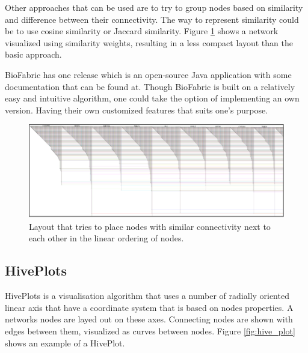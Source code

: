 \documentclass[a4paper,11pt]{kth-mag}
\begin{document}
Other approaches that can be used are to try to group nodes based on similarity and difference between their connectivity. The way to
represent similarity could be to use cosine similarity\cite{website:Wikipedia} or Jaccard similarity\cite{website:Wikipedia2}. Figure \ref{fig:bio_sim} shows a network visualized 
using similarity weights, resulting in a less compact layout than the basic approach.

BioFabric has one release which is an open-source Java application with some documentation that can be found at\cite{website:biofabricdoc}. Though BioFabric is built on a relatively easy and intuitive algorithm, one could
take the option of implementing an own version. Having their own customized features that suits one's purpose.
\\


\begin{figure}[!htbp]
	\centering
	\includegraphics[scale=0.5]{BIOSim}
	\caption{Layout that tries to place nodes with similar connectivity next to each other in the linear ordering of nodes.}
	\label{fig:bio_sim}
\end{figure}

\subsection{HivePlots}
HivePlots is a visualisation algorithm that uses a number of radially oriented linear axis that have a coordinate system that is based on nodes properties. A networks nodes are layed out on these axes. Connecting nodes are
shown with edges between them, visualized as curves between nodes. Figure \ref{fig:hive_plot} shows an example of a HivePlot.
\end{document}
